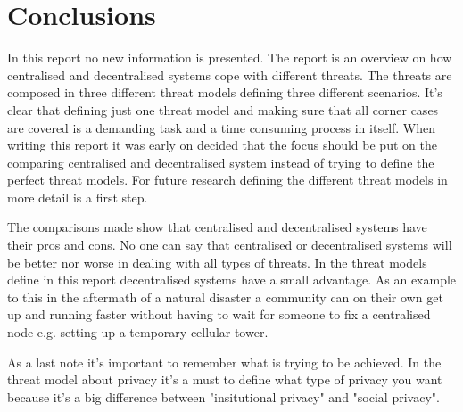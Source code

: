 \section{Conclusions}
In this report no new information is presented.
The report is an overview on how centralised and decentralised systems cope with different threats.
The threats are composed in three different threat models defining three different scenarios.
It's clear that defining just one threat model and making sure that all corner cases are covered is a demanding task and a time consuming process in itself.
When writing this report it was early on decided that the focus should be put on the comparing centralised and decentralised system instead of trying to define the perfect threat models.
For future research defining the different threat models in more detail is a first step.

The comparisons made show that centralised and decentralised systems have their pros and cons.
No one can say that centralised or decentralised systems will be better nor worse in dealing with all types of threats.
In the threat models define in this report decentralised systems have a small advantage.
As an example to this in the aftermath of a natural disaster a community can on their own get up and running faster without having to wait for someone to fix a centralised node e.g. setting up a temporary cellular tower.

As a last note it's important to remember what is trying to be achieved.
In the threat model about privacy it's a must to define what type of privacy you want because it's a big difference between "insitutional privacy" and "social privacy".
